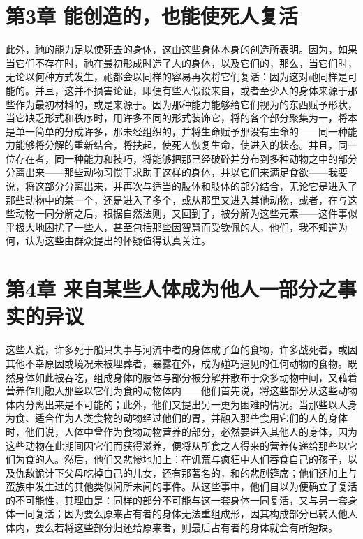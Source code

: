 \section{第3章 能创造的，也能使死人复活}

此外，祂的能力足以使死去的身体，这由这些身体本身的创造所表明。因为，如果当它们不存在时，祂在最初形成时造了人的身体，以及它们的，那么，当它们时，无论以何种方式发生，祂都会以同样的容易再次将它们复活：因为这对祂同样是可能的。并且，这并不损害论证，即便有些人假设来自，或者至少人的身体来源于那些作为最初材料的，或是来源于。因为那种能力能够给它们视为的东西赋予形状，当它缺乏形式和秩序时，用许多不同的形式装饰它，将的各个部分聚集为一，将本是单一简单的分成许多，那未经组织的，并将生命赋予那没有生命的——同一种能力能够将分解的重新结合，将扶起，使死人恢复生命，使进入的状态。并且，同一位存在者，同一种能力和技巧，将能够把那已经破碎并分布到多种动物之中的部分分离出来——那些动物习惯于求助于这样的身体，并以它们来满足食欲——我要说，将这部分分离出来，并再次与适当的肢体和肢体的部分结合，无论它是进入了那些动物中的某一个，还是进入了多个，或从那里又进入其他动物，或者，在与这些动物一同分解之后，根据自然法则，又回到了，被分解为这些元素——这件事似乎极大地困扰了一些人，甚至包括那些因智慧而受钦佩的人，他们，我不知道为何，认为这些由群众提出的怀疑值得认真关注。\par


\section{第4章 来自某些人体成为他人一部分之事实的异议}

这些人说，许多死于船只失事与河流中者的身体成了鱼的食物，许多战死者，或因其他不幸原因或境况未被埋葬者，暴露在外，成为碰巧遇见的任何动物的食物。既然身体如此被吞吃，组成身体的肢体与部分被分解并散布于众多动物中间，又藉着营养作用融入那些以它们为食的动物体内——他们首先说，将这些部分从这些动物体内分离出来是不可能的；此外，他们又提出另一更为困难的情况。当那些以人身为食、适合作为人类食物的动物经过他们的胃，并融入那些食用它们的人的身体时，他们说，人体中曾作为食物动物营养的部分，必然要进入其他人的身体，因为这些动物在此期间因它们而获得滋养，便将从所食之人得来的营养传递给那些以它们为食的人。然后，他们又悲惨地加上：在饥荒与疯狂中人们吞食自己的孩子，以及仇敌诡计下父母吃掉自己的儿女，还有那著名的，和的悲剧筵席；他们还加上与蛮族中发生过的其他类似闻所未闻的事件。从这些事中，他们自以为便确立了复活的不可能性，其理由是：同样的部分不可能与这一套身体一同复活，又与另一套身体一同复活；因为要么原来占有者的身体无法重组成形，因其构成部分已转入他人体内，要么若将这些部分归还给原来者，则最后占有者的身体就会有所短缺。\par

